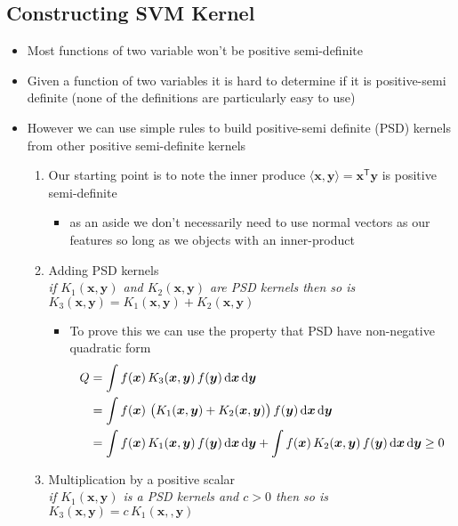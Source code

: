 \documentclass[11pt]{article}
\newcommand{\tr}{\textsf{T}}
\newcommand{\dd}{\mathrm{d}}
\begin{document}
\subsection{Constructing SVM Kernel}
\label{sec:org724c5d5}
\begin{itemize}
\item Most functions of two variable won't be positive semi-definite
\item Given a function of two variables it is hard to determine if it
is positive-semi definite (none of the definitions are
particularly easy to use)
\item However we can use simple rules to build positive-semi definite (PSD)
kernels from other positive semi-definite kernels
\begin{enumerate}
\item Our starting point is to note the inner produce \(\langle \bm{x},
	\bm{y} \rangle = \bm{x}^\tr \bm{y}\) is positive semi-definite
\begin{itemize}
\item as an aside we don't necessarily need to use normal vectors as
our features so long as we objects with an inner-product
\end{itemize}
\item Adding PSD kernels\\
\emph{if \(K_1(\bm{x},\bm{y})\) and \(K_2(\bm{x}, \bm{y})\) are PSD kernels then so is \(K_3(\bm{x}, \bm{y}) = K_1(\bm{x}, \bm{y}) + K_2(\bm{x}, \bm{y})\)}
\begin{itemize}
\item To prove this we can use the property that PSD have
non-negative quadratic form
\begin{align*}
Q &= \int f(\bm{x})\, K_3(\bm{x}, \bm{y}) \, f(\bm{y})
 \, \dd \bm{x}  \, \dd \bm{y} \\
 &=\int f(\bm{x})\, \left( \strut K_1(\bm{x}, \bm{y}) + K_2(\bm{x},
 \bm{y}) \right)  f(\bm{y}) \, \dd \bm{x}  \, \dd \bm{y} \\
 &=\int f(\bm{x})\, K_1(\bm{x}, \bm{y}) \, f(\bm{y}) \, \dd \bm{x}  \, \dd \bm{y} +
 \int f(\bm{x})\, K_2(\bm{x}, \bm{y}) \, f(\bm{y}) \, \dd \bm{x}  \, \dd \bm{y}
 \geq 0
 \end{align*}
\end{itemize}
\item Multiplication by a positive scalar\\
\emph{if \(K_1(\bm{x},\bm{y})\) is a PSD kernels and \(c>0\) then so is \(K_3(\bm{x}, \bm{y}) = c\,K_1(\bm{x},,\bm{y})\)}
\begin{itemize}

\end{itemize}
\end{enumerate}
\end{itemize}
\end{document}
